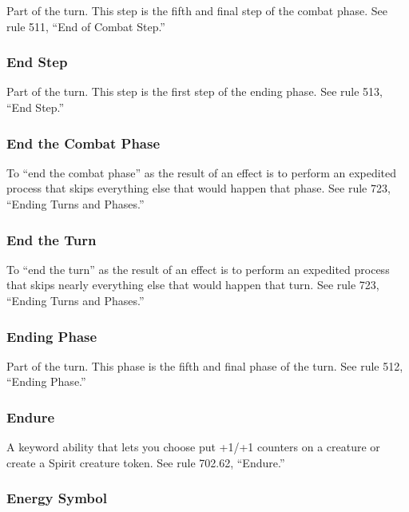 {{{{{{{Part of the turn. This step is the fifth and final step of the combat phase. See rule 511, “End of Combat Step.”

\subsubsection*{End Step}

Part of the turn. This step is the first step of the ending phase. See rule 513, “End Step.”

\subsubsection*{End the Combat Phase}

To “end the combat phase” as the result of an effect is to perform an expedited process that skips everything else that would happen that phase. See rule 723, “Ending Turns and Phases.”

\subsubsection*{End the Turn}

To “end the turn” as the result of an effect is to perform an expedited process that skips nearly everything else that would happen that turn. See rule 723, “Ending Turns and Phases.”

\subsubsection*{Ending Phase}

Part of the turn. This phase is the fifth and final phase of the turn. See rule 512, “Ending Phase.”

\subsubsection*{Endure}

A keyword ability that lets you choose put +1/+1 counters on a creature or create a Spirit creature token. See rule 702.62, “Endure.”

\subsubsection*{Energy Symbol}

}}}}}}}

